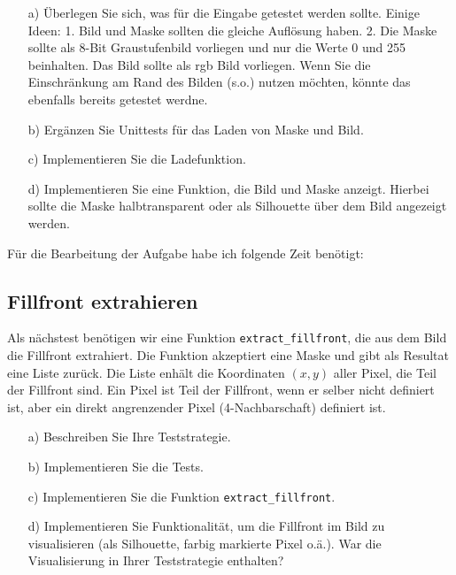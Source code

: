 \begin{enumerate}

\item[a)] Überlegen Sie sich, was für die Eingabe getestet werden sollte. Einige Ideen: 1. Bild und Maske sollten die gleiche Auflösung haben. 2. Die Maske sollte als 8-Bit Graustufenbild vorliegen und nur die Werte 0 und 255 beinhalten. Das Bild sollte als rgb Bild vorliegen. Wenn Sie die Einschränkung am Rand des Bilden (s.o.) nutzen möchten,  könnte das ebenfalls bereits getestet werdne. 

\item[b)] Ergänzen Sie Unittests für das Laden von Maske und Bild. 

\item[c)] Implementieren Sie die Ladefunktion.

\item[d)] Implementieren Sie eine Funktion, die Bild und Maske anzeigt. Hierbei sollte die Maske halbtransparent oder als Silhouette über dem Bild angezeigt werden.

\end{enumerate}

Für die Bearbeitung der Aufgabe habe ich folgende Zeit benötigt:

\subsection{Fillfront extrahieren}

Als nächstest benötigen wir eine Funktion \texttt{extract\_fillfront}, die aus dem Bild die Fillfront extrahiert. Die Funktion akzeptiert eine Maske und gibt als Resultat eine Liste zurück. Die Liste enhält die 
Koordinaten $(x,y)$ aller Pixel, die Teil der Fillfront sind. Ein Pixel ist Teil der Fillfront, wenn er selber  nicht definiert ist, aber ein direkt angrenzender Pixel (4-Nachbarschaft) definiert ist.

\begin{enumerate}

\item[a)] Beschreiben Sie Ihre Teststrategie.

\item[b)] Implementieren Sie die Tests. 

\item[c)] Implementieren Sie die Funktion \texttt{extract\_fillfront}. 

\item[d)] Implementieren Sie Funktionalität, um die Fillfront im Bild zu visualisieren (als Silhouette, farbig markierte Pixel o.ä.). War die Visualisierung in Ihrer Teststrategie enthalten?

\end{enumerate}

